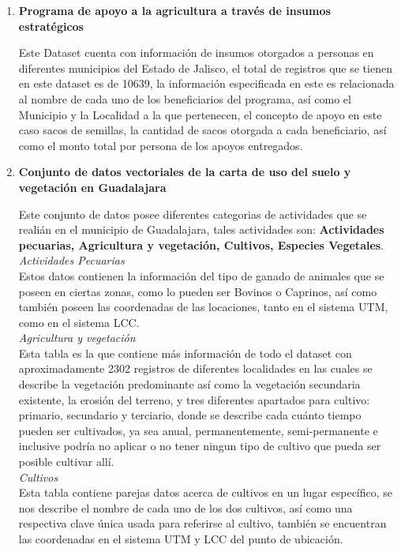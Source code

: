 \documentclass[10pt,letterpaper]{article}
\begin{document}
\begin{enumerate}
\item \textbf{Programa de apoyo a la agricultura a trav\'es de insumos estrat\'egicos} 

Este Dataset cuenta con informaci\'on de insumos otorgados a personas en diferentes municipios del Estado de Jalisco, el total de registros que se tienen en este dataset es de 10639, la informaci\'on especificada en este es relacionada al nombre de cada uno de los beneficiarios del programa, as\'i como el Municipio y la Localidad a la que pertenecen, el concepto de apoyo en este caso sacos de semillas, la cantidad de sacos otorgada a cada beneficiario, as\'i como el monto total por persona de los apoyos entregados.

\item \textbf{Conjunto de datos vectoriales de la carta de uso del suelo y vegetaci\'on en Guadalajara}

Este conjunto de datos posee diferentes categorias de actividades que se reali\'an en el municipio de Guadalajara, tales actividades son: \textbf{Actividades pecuarias, Agricultura y vegetaci\'on, Cultivos, Especies Vegetales}.\\

\textit{Actividades Pecuarias} \\
Estos datos contienen la informaci\'on del tipo de ganado de animales que se poseen en ciertas zonas, como lo pueden ser Bovinos o Caprinos, as\'i como tambi\'en poseen las coordenadas de las locaciones, tanto en el sistema UTM, como en el sistema LCC. \\

\textit{Agricultura y vegetaci\'on}\\
Esta tabla es la que contiene m\'as informaci\'on de todo el dataset con aproximadamente 2302 registros de diferentes localidades en las cuales se describe la vegetaci\'on predominante as\'i como la vegetaci\'on secundaria existente, la erosi\'on del terreno, y tres diferentes apartados para cultivo: primario, secundario y terciario, donde se describe cada cu\'anto tiempo pueden ser cultivados, ya sea anual, permanentemente, semi-permanente e inclusive podr\'ia no aplicar o no tener ningun tipo de cultivo que pueda ser posible cultivar all\'i.\\

\textit{Cultivos}\\
Esta tabla contiene parejas datos acerca de cultivos en un lugar espec\'ifico, se nos describe el nombre de cada uno de los dos cultivos, as\'i como una respectiva clave \'unica usada para referirse al cultivo, tambi\'en se encuentran las coordenadas en el sistema UTM y LCC del punto de ubicaci\'on.


\end{enumerate}
\end{document}
